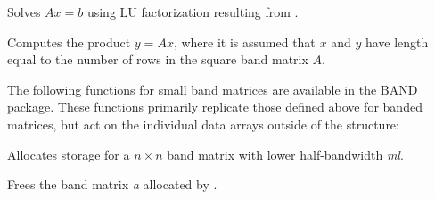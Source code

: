 \documentclass[letterpaper,10pt,english]{sphinxmanual}
\begin{document}

\begin{fulllineitems}
\label{linear_solvers/DLS:c.BandGBTRS}
Solves \(Ax = b\) using LU factorization resulting from
{\hyperref[linear_solvers/DLS:c.BandGBTRF]{\emph{}}}.

\end{fulllineitems}


\begin{fulllineitems}
\label{linear_solvers/DLS:c.BandMatvec}
Computes the product \(y = Ax\), where it is assumed that
\(x\) and \(y\) have length equal to the number of rows in
the square band matrix \(A\).

\end{fulllineitems}


The following functions for small band matrices are available in the
BAND package.  These functions primarily replicate those defined above
for {\hyperref[linear_solvers/DLS:c.DlsMat]{\emph{}}} banded matrices, but act on the individual data arrays
outside of the {\hyperref[linear_solvers/DLS:c.DlsMat]{\emph{}}} structure:

\begin{fulllineitems}
\label{linear_solvers/DLS:c.newBandMat}
Allocates storage for a \(n \times n\) band matrix with lower
half-bandwidth \emph{ml}.

\end{fulllineitems}


\begin{fulllineitems}
Frees the band matrix \emph{a} allocated by {\hyperref[linear_solvers/DLS:c.newBandMat]{\emph{}}}.

\end{fulllineitems}

\end{document}
